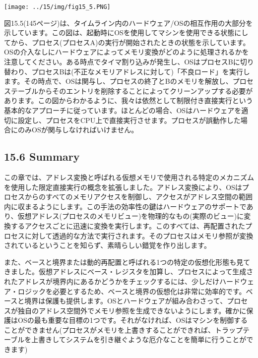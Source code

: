 \texttt{[image: ../15/img/fig15\_5.PNG]}

図15.5(145ページ)は、タイムライン内のハードウェア/OSの相互作用の大部分を示しています。この図は、起動時にOSを使用してマシンを使用できる状態にしてから、プロセス(プロセスA)の実行が開始されたときの状態を示しています。OSの介入なしにハードウェアによってメモリ変換がどのように処理されるかを注意してください。ある時点でタイマ割り込みが発生し、OSはプロセスBに切り替わり、プロセスBは(不正なメモリアドレスに対して)「不良ロード」を実行します。その時点で、OSは関与し、プロセスの終了とBのメモリを解放し、プロセステーブルからそのエントリを削除することによってクリーンアップする必要があります。この図からわかるように、我々は依然として制限付き直接実行という基本的なアプローチに従っています。ほとんどの場合、OSはハードウェアを適切に設定し、プロセスをCPU上で直接実行させます。プロセスが誤動作した場合にのみOSが関与しなければいけません。

\hypertarget{summary-8}{%
\subsection*{15.6 Summary}\label{summary-8}}

この章では、アドレス変換と呼ばれる仮想メモリで使用される特定のメカニズムを使用した限定直接実行の概念を拡張しました。アドレス変換により、OSはプロセスからのすべてのメモリアクセスを制御し、アクセスがアドレス空間の範囲内に収まるようにします。この手法の効率性の鍵はハードウェアのサポートであり、仮想アドレス(プロセスのメモリビュー)を物理的なもの(実際のビュー)に変換するアクセスごとに迅速に変換を実行します。このすべては、再配置されたプロセスに対して透過的な方法で実行されます。そのプロセスはメモリ参照が変換されているということを知らず、素晴らしい錯覚を作り出します。

また、ベースと境界または動的再配置と呼ばれる1つの特定の仮想化形態も見てきました。仮想アドレスにベース・レジスタを加算し、プロセスによって生成されたアドレスが境界内にあるかどうかをチェックするには、少しだけハードウェア・ロジックを必要とするため、ベースと境界の仮想化は非常に効率的です。ベースと境界は保護も提供します。OSとハードウェアが組み合わさって、プロセスが独自のアドレス空間外でメモリ参照を生成できないようにします。確かに保護はOSの最も重要な目標の1つです。それがなければ、OSはマシンを制御することができません(プロセスがメモリを上書きすることができれば、トラップテーブルを上書きしてシステムを引き継ぐような厄介なことを簡単に行うことができます)

